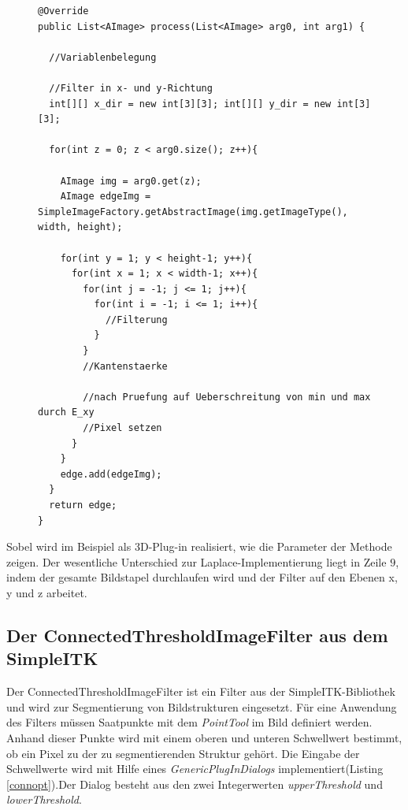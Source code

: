 \begin{figure}[htbp]
\begin{lstlisting}[frame=leftline]
@Override
public List<AImage> process(List<AImage> arg0, int arg1) {
		
  //Variablenbelegung
		
  //Filter in x- und y-Richtung
  int[][] x_dir = new int[3][3]; int[][] y_dir = new int[3][3];
  	
  for(int z = 0; z < arg0.size(); z++){

    AImage img = arg0.get(z);
    AImage edgeImg = SimpleImageFactory.getAbstractImage(img.getImageType(), width, height);

    for(int y = 1; y < height-1; y++){
      for(int x = 1; x < width-1; x++){
        for(int j = -1; j <= 1; j++){
          for(int i = -1; i <= 1; i++){
            //Filterung
          }
        }
        //Kantenstaerke
					
        //nach Pruefung auf Ueberschreitung von min und max durch E_xy
        //Pixel setzen
      }
    }
    edge.add(edgeImg);
  }
  return edge;
}
\end{lstlisting}
\end{figure}

Sobel wird im Beispiel als 3D-Plug-in realisiert, wie die Parameter der Methode zeigen. Der wesentliche Unterschied zur Laplace-Implementierung liegt in Zeile $9$, indem der gesamte Bildstapel durchlaufen wird und der Filter auf den Ebenen x, y und z arbeitet.

\FloatBarrier
\subsection{Der ConnectedThresholdImageFilter aus dem SimpleITK}

Der ConnectedThresholdImageFilter ist ein Filter aus der SimpleITK-Bibliothek und wird zur Segmentierung von Bildstrukturen eingesetzt. Für eine Anwendung des Filters müssen Saatpunkte mit dem \textit{PointTool} im Bild definiert werden. Anhand dieser Punkte wird mit einem oberen und unteren Schwellwert bestimmt, ob ein Pixel zu der zu segmentierenden Struktur gehört. Die Eingabe der Schwellwerte wird mit Hilfe eines \textit{GenericPlugInDialogs} implementiert(Listing \ref{connopt}).Der Dialog besteht aus den zwei Integerwerten \textit{upperThreshold} und \textit{lowerThreshold}.

